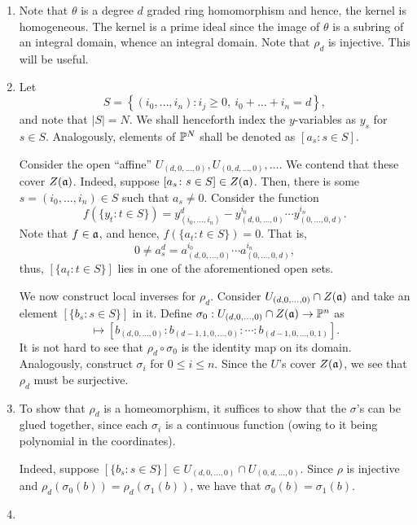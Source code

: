 \begin{exercise}
\begin{enumerate}[label=(\alph*)]
    \item Note that $\theta$ is a degree $d$ graded ring homomorphism and hence, the kernel is homogeneous. The kernel is a prime ideal since the image of $\theta$ is a subring of an integral domain, whence an integral domain. Note that $\rho_d$ is injective. This will be useful.
    \item Let
    \begin{equation*}
        S = \left\{(i_0,\dots, i_n)\colon i_j\ge 0,~i_0 + \dots + i_n = d\right\},
    \end{equation*}
    and note that $|S| = N$. We shall henceforth index the $y$-variables as $y_s$ for $s\in S$. Analogously, elements of $\mathbb{P}^N$ shall be denoted as $[a_s\colon s\in S]$.

    Consider the open ``affine'' $U_{(d,0,\dots, 0)}, U_{(0,d,\dots, 0)},\dots$. We contend that these cover $Z(\mathfrak{a})$. Indeed, suppose $[a_s\colon s\in S]\in Z(\mathfrak{a})$. Then, there is some $s = (i_0,\dots,i_n)\in S$ such that $a_s\ne 0$. Consider the function 
    \begin{equation*}
        f(\{y_t\colon t\in S\}) = y_{(i_0,\dots, i_n)}^d - y_{(d,0,\dots, 0)}^{i_0}\cdots y_{(0,\dots, 0, d)}^{i_n}.
    \end{equation*}
    Note that $f\in\mathfrak{a}$, and hence, $f(\{a_t\colon t\in S\}) = 0$. That is, 
    \begin{equation*}
        0\ne a_s^d = a_{(d,0,\dots, 0)}^{i_0}\cdots a_{(0,\dots, 0, d)}^{i_n},
    \end{equation*}
    thus, $[\{a_t\colon t\in S\}]$ lies in one of the aforementioned open sets.

    We now construct local inverses for $\rho_d$. Consider $U_{(d,0,\dots,0)}\cap Z(\mathfrak{a})$ and take an element $[\{b_s\colon s\in S\}]$ in it. Define $\sigma_0: U_{(d,0,\dots,0)}\cap Z(\mathfrak{a})\to\mathbb{P}^n$ as 
    \begin{equation*}
        [\{b_s\colon s\in S\}]\mapsto \left[b_{(d,0,\dots, 0)} : b_{(d - 1, 1, 0,\dots, 0)} : \cdots : b_{(d - 1, 0,\dots, 0, 1)}\right].
    \end{equation*}
    It is not hard to see that $\rho_d\circ\sigma_0$ is the identity map on its domain. Analogously, construct $\sigma_i$ for $0\le i\le n$. Since the $U$'s cover $Z(\mathfrak{a})$, we see that $\rho_d$ must be surjective.

    \item To show that $\rho_d$ is a homeomorphism, it suffices to show that the $\sigma$'s can be glued together, since each $\sigma_i$ is a continuous function (owing to it being polynomial in the coordinates).

    Indeed, suppose $[\{b_s\colon s\in S\}]\in U_{(d,0,\dots, 0)}\cap U_{(0,d,\dots, 0)}$. Since $\rho$ is injective and $\rho_d(\sigma_0(b)) = \rho_d(\sigma_1(b))$, we have that $\sigma_0(b) = \sigma_1(b)$. 

    \item
\end{enumerate}
\end{exercise}

